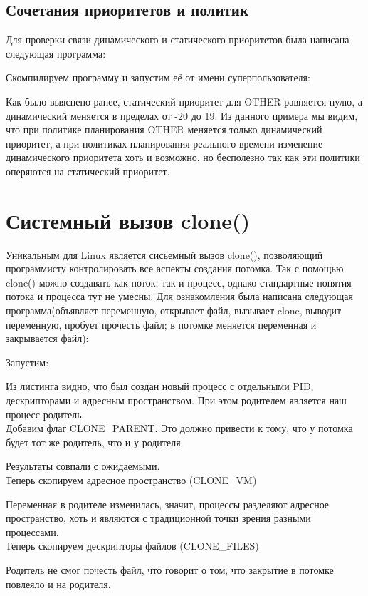 \documentclass[a4paper]{article}
\begin{document}
\subsection{Сочетания приоритетов и политик}
	Для проверки связи динамического и статического приоритетов была написана следующая программа:
	
	Скомпилируем программу и запустим её от имени суперпользователя:
	
	Как было выяснено ранее, статический приоритет для OTHER равняется нулю, а динамический меняется в пределах от -20 до 19. Из данного примера мы видим, что при политике планирования OTHER меняется только динамический приоритет, а при политиках планирования реального времени изменение динамического приоритета хоть и возможно, но бесполезно так как эти политики оперяются на статический приоритет. 


	\section{Системный вызов clone()}
	Уникальным для Linux является сисьемный вызов clone(), позволяющий программисту контролировать все аспекты создания потомка. Так с помощью clone() можно создавать как поток, так и процесс, однако стандартные понятия потока и процесса тут не умесны. Для ознакомления была написана следующая программа(объявляет переменную, открывает файл, вызывает clone, выводит переменную, пробует прочесть файл; в потомке меняется переменная и закрывается файл):
	
	Запустим:
	
	Из листинга видно, что был создан новый процесс с отдельными PID, дескрипторами и адресным пространством. При этом родителем является наш процесс родитель.\\
	
	Добавим флаг CLONE\_PARENT. Это должно привести к тому, что у потомка будет тот же родитель, что и у родителя.
	
	Результаты совпали с ожидаемыми.\\

	Теперь скопируем адресное пространство (CLONE\_VM)	
	
	Переменная в родителе изменилась, значит, процессы разделяют адресное пространство, хоть и являются с традиционной точки зрения разными процессами.\\

	Теперь скопируем дескрипторы файлов (CLONE\_FILES)
	
	Родитель не смог почесть файл, что говорит о том, что закрытие в потомке повлеяло и на родителя.\\
\end{document}
